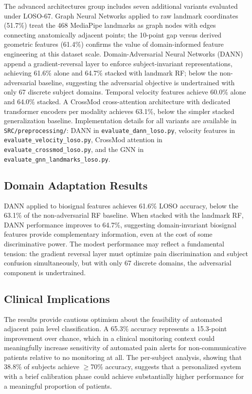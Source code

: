 \documentclass[10pt, twocolumn]{article}
\begin{document}
The advanced architectures group includes seven additional variants evaluated under
LOSO-67. Graph Neural Networks applied to raw landmark coordinates (51.7\%) treat the 468
MediaPipe landmarks as graph nodes with edges connecting anatomically adjacent points; the
10-point gap versus derived geometric features (61.4\%) confirms the value of
domain-informed feature engineering at this dataset scale. Domain-Adversarial Neural
Networks (DANN) append a gradient-reversal layer to enforce subject-invariant
representations, achieving 61.6\% alone and 64.7\% stacked with landmark RF; below the
non-adversarial baseline, suggesting the adversarial objective is undertrained with only
67 discrete subject domains. Temporal velocity features achieve 60.0\% alone and 64.0\%
stacked. A CrossMod cross-attention architecture with dedicated transformer encoders per
modality achieves 63.1\%, below the simpler stacked generalization baseline.
Implementation details for all variants are available in \texttt{SRC/preprocessing/}:
DANN in \texttt{evaluate\_dann\_loso.py}, velocity features in
\texttt{evaluate\_velocity\_loso.py}, CrossMod attention in
\texttt{evaluate\_crossmod\_loso.py}, and the GNN in
\texttt{evaluate\_gnn\_landmarks\_loso.py}.

\subsection{Domain Adaptation Results}

DANN applied to biosignal features achieves 61.6\% LOSO accuracy, below the 63.1\% of
the non-adversarial RF baseline. When stacked with the landmark RF, DANN performance
improves to 64.7\%, suggesting domain-invariant biosignal features provide complementary
information, even at the cost of some discriminative power. The modest performance may
reflect a fundamental tension: the gradient reversal layer must optimize pain
discrimination and subject confusion simultaneously, but with only 67 discrete domains,
the adversarial component is undertrained.

\subsection{Clinical Implications}

The results provide cautious optimism about the feasibility of automated adjacent pain
level classification. A 65.3\% accuracy represents a 15.3-point improvement over chance,
which in a clinical monitoring context could meaningfully increase sensitivity of automated
pain alerts for non-communicative patients relative to no monitoring at all. The per-subject
analysis, showing that 38.8\% of subjects achieve $\geq$70\% accuracy, suggests that a
personalized system with a brief calibration phase could achieve substantially higher
performance for a meaningful proportion of patients.
\end{document}
